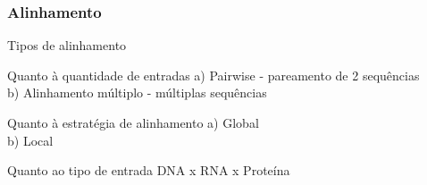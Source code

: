 \documentclass{beamer}
\begin{document}
    	\begin{frame}\frametitle{Alinhamento}
    	\begin{block}{Tipos de alinhamento}\end{block}
    	\begin{block}{Quanto à quantidade de entradas}
    		a) Pairwise - pareamento de 2 sequências\\
    		b) Alinhamento múltiplo - múltiplas sequências
    	\end{block}
    	\begin{block}{Quanto à estratégia de alinhamento}
    		a) Global\\
    		b) Local
    	\end{block}
    	\begin{block}{Quanto ao tipo de entrada}
    		DNA x RNA x Proteína
    	\end{block}
    \end{frame}
\end{document}
